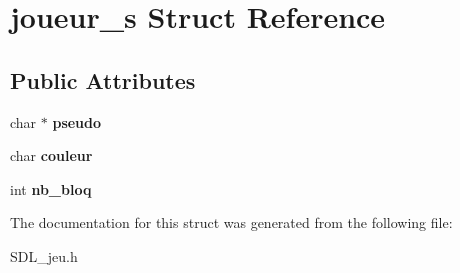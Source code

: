 \hypertarget{structjoueur__s}{}\section{joueur\+\_\+s Struct Reference}
\label{structjoueur__s}
\subsection*{Public Attributes}
\begin{DoxyCompactItemize}
\item 
\mbox{\label{structjoueur__s_a71567e658664676593283e2cc12640cd}} 
char $\ast$ {\bfseries pseudo}
\item 
\mbox{\label{structjoueur__s_ac50306247a0f773f23692327cf17d679}} 
char {\bfseries couleur}
\item 
\mbox{\label{structjoueur__s_aa08528760be2ab809b8aaabea723f18b}} 
int {\bfseries nb\+\_\+bloq}
\end{DoxyCompactItemize}


The documentation for this struct was generated from the following file\+:\begin{DoxyCompactItemize}
\item 
S\+D\+L\+\_\+jeu.\+h\end{DoxyCompactItemize}
